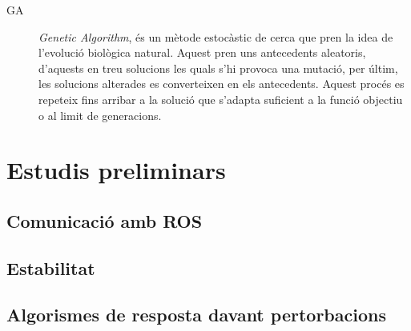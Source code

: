 \documentclass[12pt,a4paper,final,twoside]{article}
\begin{document}
\begin{description}
\item[GA] \textit{Genetic Algorithm}, és un mètode estocàstic de cerca que pren la idea de l'evolució biològica natural. Aquest pren uns antecedents aleatoris, d'aquests en treu solucions les quals s'hi provoca una mutació, per últim, les solucions alterades es converteixen en els antecedents. Aquest procés es repeteix fins arribar a la solució que s'adapta suficient a la funció objectiu o al limit de generacions.

\end{description}


\newpage

\label{Estudis-preliminars}
\section{Estudis preliminars}


\label{ROS-estudi-pre}
\subsection{Comunicació amb ROS}



\label{Estabilitat}
\subsection{Estabilitat}


\subsection{Algorismes de resposta davant pertorbacions}
\label{Algorismes}
\end{document}
